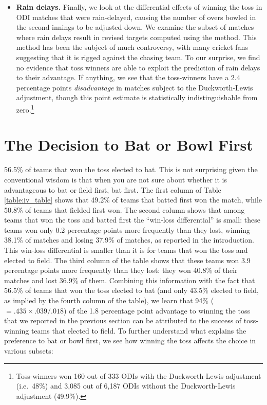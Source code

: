 \documentclass[12pt, letterpaper]{article}
\begin{document}
\begin{itemize}
\item \textbf{Rain delays.} Finally, we look at the differential effects of winning the toss in ODI matches that were rain-delayed, causing the number of overs bowled in the second innings to be adjusted down. We examine the subset of matches where rain delays result in revised targets computed using the \citet{duckworth1998} method. This method has been the subject of much controversy, with many cricket fans suggesting that it is rigged against the chasing team. To our surprise, we find no evidence that toss winners are able to exploit the prediction of rain delays to their advantage. If anything, we see that the toss-winners have a 2.4 percentage points \emph{disadvantage} in matches subject to the Duckworth-Lewis adjustment, though this point estimate is statistically indistinguishable from zero.\footnote{Toss-winners won 160 out of 333 ODIs with the Duckworth-Lewis adjustment (i.e.~48\%) and 3,085 out of 6,187 ODIs without the Duckworth-Lewis adjustment (49.9\%).} 

\end{itemize}

\section{The Decision to Bat or Bowl First}

56.5\% of teams that won the toss elected to bat. This is not surprising given the conventional wisdom is that when you are not sure about whether it is advantageous to bat or field first, bat first. The first column of Table \ref{table:iv_table} shows that 49.2\% of teams that batted first won the match, while 50.8\% of teams that fielded first won. The second column shows that among teams that won the toss and batted first the ``win-loss differential'' is small: these teams won only 0.2 percentage points more frequently than they lost, winning 38.1\% of matches and losing 37.9\% of matches, as reported in the introduction. This win-loss differential is smaller than it is for teams that won the toss and elected to field. The third column of the table shows that these teams won 3.9 percentage points more frequently than they lost: they won 40.8\% of their matches and lost 36.9\% of them. Combining this information with the fact that 56.5\% of teams that won the toss elected to bat (and only 43.5\% elected to field, as implied by the fourth column of the table), we learn that 94\% ($= .435 \times .039/.018$) of the 1.8 percentage point advantage to winning the toss that we reported in the previous section can be attributed to the success of toss-winning teams that elected to field. To further understand what explains the preference to bat or bowl first, we see how winning the toss affects the choice in various subsets:
\end{document}
